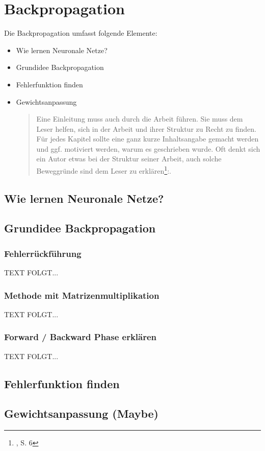 \newpage
\thispagestyle{empty}
\section{Backpropagation}\label{sec:backpropagation}   

\vspace{1cm}
\begin{tcolorbox}[title={Inhalt}]
Die Backpropagation umfasst folgende Elemente:
\begin{itemize}
\item Wie lernen Neuronale Netze?
\item Grundidee Backpropagation
\item Fehlerfunktion finden
\item Gewichtsanpassung
\begin{quotation}
Eine Einleitung muss auch durch die Arbeit führen. Sie muss dem Leser helfen, sich in der Arbeit und ihrer Struktur zu Recht zu finden. Für jedes Kapitel sollte eine ganz kurze Inhaltsangabe gemacht werden und ggf. motiviert werden, warum es geschrieben wurde. Oft denkt sich ein Autor etwas bei der Struktur seiner Arbeit, auch solche Beweggründe sind dem Leser zu erklären\footnote{\cite{BBoJ}, S. 6}:. 
\end{quotation}
\end{itemize}
\end{tcolorbox}

\subsection{Wie lernen Neuronale Netze?}\label{subsec:backpropagation:lernen_nn}

\subsection{Grundidee Backpropagation}\label{subsec:backpropagation:grundiee}
\subsubsection{Fehlerrückführung}\label{subsec:backpropagation:fehlerrueckfuehrung}
  TEXT FOLGT...

\subsubsection{Methode mit Matrizenmultiplikation}\label{subsec:backpropagation:matrizen}
  TEXT FOLGT...

\subsubsection{Forward / Backward Phase erklären}\label{subsec:backpropagation:forward_backward}
  TEXT FOLGT...

\subsection{Fehlerfunktion finden}\label{subsec:backpropagation:fehlerfunktion}

\subsection{Gewichtsanpassung (Maybe)}\label{subsec:backpropagation:gewichtsanpassung}